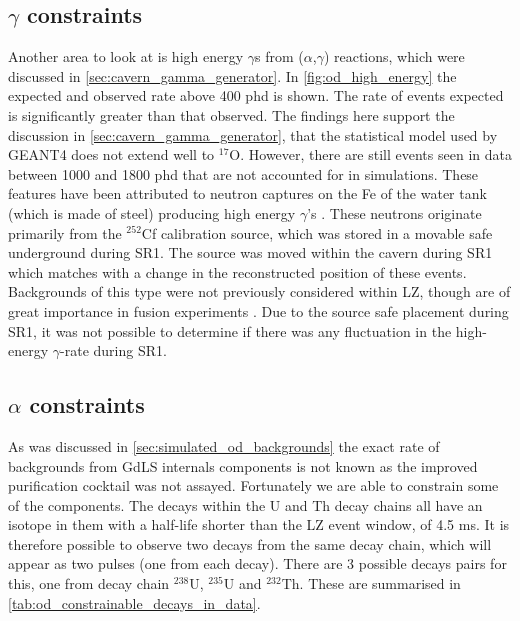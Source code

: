\subsection{$\gamma$ constraints}
\par
Another area to look at is high energy $\gamma$s from ($\alpha$,$\gamma$) reactions, which were discussed in \autoref{sec:cavern_gamma_generator}.
In \autoref{fig:od_high_energy} the expected and observed rate above 400 phd is shown.
The rate of events expected is significantly greater than that observed.
The findings here support the discussion in \autoref{sec:cavern_gamma_generator}, that the statistical model used by GEANT4 does not extend well to ${}^{17}$O.
However, there are still events seen in data between 1000 and 1800 phd that are not accounted for in simulations.
These features have been attributed to neutron captures on the Fe of the water tank (which is made of steel) producing high energy $\gamma$'s \cite{iron_neutrons_ref}.
These neutrons originate primarily from the ${}^{252}$Cf calibration source, which was stored in a movable safe underground during SR1.
The source was moved within the cavern during SR1 which matches with a change in the reconstructed position of these events.
Backgrounds of this type were not previously considered within LZ, though are of great importance in fusion experiments \cite{iter_neutrons_ref}.
Due to the source safe placement during SR1, it was not possible to determine if there was any fluctuation in the high-energy $\gamma$-rate during SR1.




\subsection{$\alpha$ constraints}
\par
As was discussed in \autoref{sec:simulated_od_backgrounds} the exact rate of backgrounds from GdLS internals components is not known as the improved purification cocktail was not assayed.
Fortunately we are able to constrain some of the components. 
The decays within the U and Th decay chains all have an isotope in them with a half-life shorter than the LZ event window, of 4.5 ms.
It is therefore possible to observe two decays from the same decay chain, which will appear as two pulses (one from each decay).
There are 3 possible decays pairs for this, one from decay chain ${}^{238}$U, ${}^{235}$U and ${}^{232}$Th.
These are summarised in \autoref{tab:od_constrainable_decays_in_data}.


